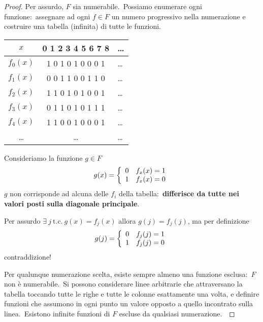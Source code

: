 \begin{proof}

    Per assurdo, $F$ sia numerabile.\
    Possiamo enumerare ogni funzione:\ assegnare ad ogni $f \in F$ un numero progressivo nella numerazione e costruire una tabella (infinita) di tutte le funzioni.\

    \begin{table}[H]
        \centering
        \begin{tabular}{c|c l}
            $x$      & 0 1 2 3 4 5 6 7 8 & \dots \\\hline
            $f_0(x)$ & 1 0 1 0 1 0 0 0 1 & \dots \\
            $f_1(x)$ & 0 0 1 1 0 0 1 1 0 & \dots \\
            $f_2(x)$ & 1 1 0 1 0 1 0 0 1 & \dots \\
            $f_3(x)$ & 0 1 1 0 1 0 1 1 1 & \dots \\
            $f_4(x)$ & 1 1 0 0 1 0 0 0 1 & \dots \\
            \dots    & \dots             & \dots \\
        \end{tabular}
    \end{table}

    \noindent Consideriamo la funzione $g \in F$
    \[g(x) = \left\{\begin{array}{l l}
            0 & f_x(x) = 1 \\
            1 & f_x(x) = 0 \\
        \end{array}\right.\]
    $g$ non corrisponde ad alcuna delle $f_i$ della tabella:\ \textbf{differisce da tutte nei valori posti sulla diagonale principale}.\

    Per assurdo $\exists\ j\ \mathrm{t.c.}\  g(x) = f_j(x)$ allora  $g(j) = f_j (j)$, ma per definizione
    \[g(j) = \left\{\begin{array}{l l}
            0 & f_j(j) = 1 \\
            1 & f_j(j) = 0 \\
        \end{array}\right.\]
    contraddizione!

    Per qualunque numerazione scelta, esiste sempre almeno una funzione esclusa:\ $F$ non è numerabile.\
    Si possono considerare linee arbitrarie che attraversano la tabella toccando tutte le righe e tutte le colonne esattamente una volta, e definire funzioni che assumono in ogni punto un valore opposto a quello incontrato sulla linea.\
    Esistono infinite funzioni di $F$ escluse da qualsiasi numerazione.\
\end{proof}


